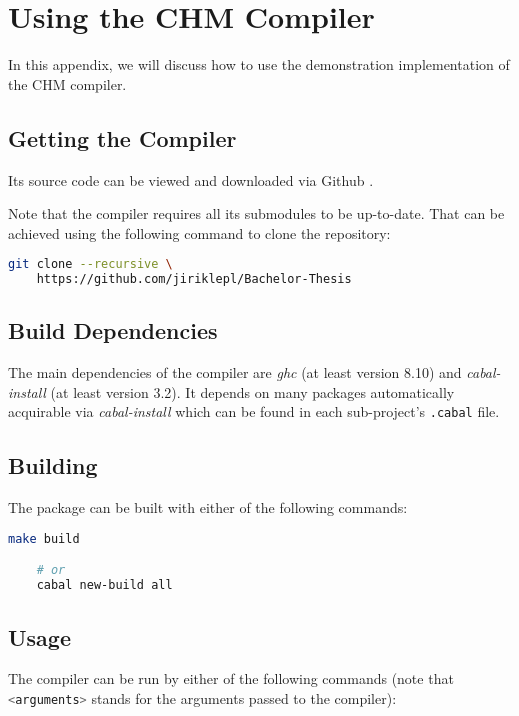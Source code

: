 \chapter{Using the CHM Compiler}

In this appendix, we will discuss how to use the demonstration implementation of the CHM compiler.

\section{Getting the Compiler}

Its source code can be viewed and downloaded via Github \cite{jiriklepl2020chmcompiler}.

Note that the compiler requires all its submodules to be up-to-date. That can be achieved using the following command to clone the repository:

\begin{lstlisting}[language=sh]
git clone --recursive \
	https://github.com/jiriklepl/Bachelor-Thesis
\end{lstlisting}

\section{Build Dependencies}

The main dependencies of the compiler are \emph{ghc} (at least version 8.10) and \emph{cabal-install} (at least version 3.2). It depends on many packages automatically acquirable via \emph{cabal-install} which can be found in each sub-project's \lstinline{.cabal} file.

\section{Building}

The package can be built with either of the following commands:

\begin{lstlisting}[language=sh]
    make build

    # or
    cabal new-build all
\end{lstlisting}


\section{Usage}

The compiler can be run by either of the following commands (note that \lstinline[language=sh]{<arguments>} stands for the arguments passed to the compiler):

